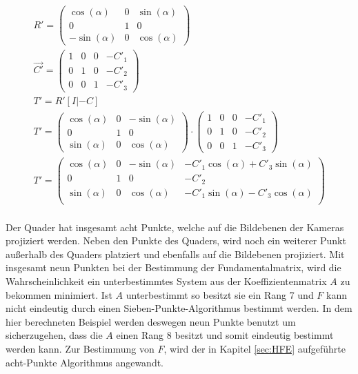 \begin{gather}			
	R'= 
	\begin{pmatrix}
		\cos(\alpha)&0&\sin(\alpha)\\
		0&1&0\\
		-\sin(\alpha)&0&\cos(\alpha)
	\end{pmatrix}\\
	\vec{C'}= 
	\begin{pmatrix}
		1&0&0&-C'_1\\
		0&1&0&-C'_2\\
		0&0&1&-C'_3			
	\end{pmatrix}\\
	T'=R'[I|-C]\\
	T'=		\begin{pmatrix}
		\cos(\alpha)&0&-\sin(\alpha)\\
		0&1&0\\
		\sin(\alpha)&0&\cos(\alpha)
	\end{pmatrix} 
	\cdot
	\begin{pmatrix}
		1&0&0&-C'_1\\
		0&1&0&-C'_2\\
		0&0&1&-C'_3			
	\end{pmatrix}\\
	T'=
	\begin{pmatrix}
		\cos(\alpha)&0&-\sin(\alpha)&-C'_1\cos(\alpha)+C'_3\sin(\alpha)\\
		0&1&0&-C'_2\\
		\sin(\alpha)&0&\cos(\alpha)&-C'_1\sin(\alpha)-C'_3\cos(\alpha)\\
	\end{pmatrix}
\end{gather}\\




Der Quader hat insgesamt acht Punkte, welche auf die Bildebenen der Kameras projiziert werden. Neben den Punkte des Quaders, wird noch ein weiterer Punkt außerhalb des Quaders platziert und ebenfalls auf die Bildebenen projiziert. Mit insgesamt neun Punkten bei der Bestimmung der Fundamentalmatrix, wird die Wahrscheinlichkeit ein unterbestimmtes System aus der Koeffizientenmatrix $A$ zu bekommen minimiert. Ist $A$ unterbestimmt so besitzt sie ein Rang 7 und $F$ kann nicht eindeutig durch einen Sieben-Punkte-Algorithmus bestimmt werden\cite{HZ,LongQuan}. In dem hier berechneten Beispiel werden deswegen neun Punkte benutzt um sicherzugehen, dass die $A$ einen Rang 8 besitzt und somit eindeutig bestimmt werden kann. Zur Bestimmung von $F$, wird der in Kapitel \ref{sec:HFE} aufgeführte acht-Punkte Algorithmus angewandt.\\



